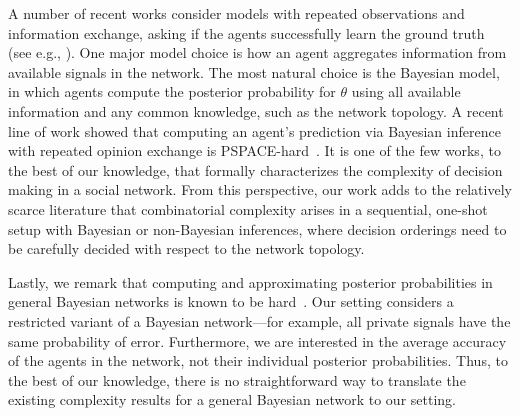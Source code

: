 A number of recent works consider models with repeated observations and information exchange, asking if the agents successfully learn the ground truth 
(see e.g., \cite{Jadbabaie2012-ob,Mossel2014-mv}). One major model choice is how an agent aggregates information from available signals in the network. The most natural choice is the Bayesian model, in which agents compute the posterior probability for $\theta$ using all available information and any common knowledge, such as the network topology. 
A recent line of work showed that computing an agent's prediction via Bayesian inference with repeated opinion exchange is PSPACE-hard~\cite{hazla2019reasoning,Hazla2021-vf}. It is one of the few works, to the best of our knowledge, that formally characterizes the complexity of decision making in a social network. 
From this perspective, our work adds to the relatively scarce literature that combinatorial complexity arises in a sequential, one-shot setup with Bayesian or non-Bayesian inferences, where decision orderings need to be carefully decided with respect to the network topology. 

Lastly, we remark that computing and approximating posterior probabilities in general Bayesian networks is known to be hard~\cite{Cooper1990-fn,Dagum1993-gd,Kwisthout2018-az}.
Our setting considers a restricted variant of a Bayesian network---for example, all private signals have the same probability of error.
Furthermore, we are interested in the average accuracy of the agents in the network, not their individual posterior probabilities.
Thus, to the best of our knowledge, there is no straightforward way to translate the existing complexity results for a general Bayesian network to our setting.
